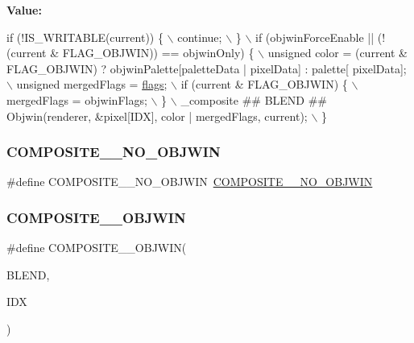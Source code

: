 {\bfseries Value\+:}
\begin{DoxyCode}
\textcolor{keywordflow}{if} (!IS\_WRITABLE(current)) \{ \(\backslash\)
        continue; \(\backslash\)
    \} \(\backslash\)
    if (objwinForceEnable || (!(current & FLAG\_OBJWIN)) == objwinOnly) \{                                   
             \(\backslash\)
        unsigned color = (current & FLAG\_OBJWIN) ? objwinPalette[paletteData | pixelData] : palette[
      pixelData]; \(\backslash\)
        unsigned mergedFlags = \mbox{\hyperlink{lr35902_2decoder_8c_a11f29eea941556f0630cfd3285f565c0}{flags}}; \(\backslash\)
        if (current & FLAG\_OBJWIN) \{ \(\backslash\)
            mergedFlags = objwinFlags; \(\backslash\)
        \} \(\backslash\)
        \_composite ## BLEND ## Objwin(renderer, &pixel[IDX], color | mergedFlags, current); \(\backslash\)
    \}
\end{DoxyCode}
\mbox{\label{software-private_8h_a3ae47df6d5deb7b584b22be27c4ffd59}} 
\subsubsection{\texorpdfstring{C\+O\+M\+P\+O\+S\+I\+T\+E\+\_\+\_\+\+N\+O\+\_\+\+O\+B\+J\+W\+IN}{COMPOSITE\_256\_NO\_OBJWIN}}
{\footnotesize\ttfamily \#define C\+O\+M\+P\+O\+S\+I\+T\+E\+\_\+\_\+\+N\+O\+\_\+\+O\+B\+J\+W\+IN~\mbox{\hyperlink{software-private_8h_a1c9c7e2f21e6afef3bd9d5d3b99aedd0}{C\+O\+M\+P\+O\+S\+I\+T\+E\+\_\+\_\+\+N\+O\+\_\+\+O\+B\+J\+W\+IN}}}

\mbox{\label{software-private_8h_ad2249e4b6507dcba8e9becf7aed21d1a}} 
\subsubsection{\texorpdfstring{C\+O\+M\+P\+O\+S\+I\+T\+E\+\_\+\_\+\+O\+B\+J\+W\+IN}{COMPOSITE\_256\_OBJWIN}}
{\footnotesize\ttfamily \#define C\+O\+M\+P\+O\+S\+I\+T\+E\+\_\+\_\+\+O\+B\+J\+W\+IN(\begin{DoxyParamCaption}\item[{}]{B\+L\+E\+ND,  }\item[{}]{I\+DX }\end{DoxyParamCaption})}

